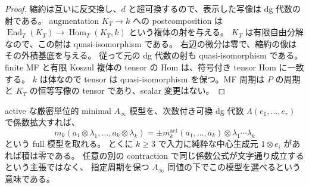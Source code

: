 \begin{proof}
縮約は互いに反交換し、$d$ と超可換するので、表示した写像は dg 代数の射である。
augmentation $K_T\to k$ への postcomposition は
$\operatorname{End}_T(K_T)\to\operatorname{Hom}_T(K_T,k)$ という複体の射を与える。
$K_T$ は有限自由分解なので、この射は quasi-isomorphism である。
右辺の微分は零で、縮約の像はその外積基底を与える。
従って元の dg 代数の射も quasi-isomorphism である。
finite MF と有限 Koszul 複体の tensor の Hom は、符号付き tensor Hom に一致する。
$k$ は体なので tensor は quasi-isomorphism を保つ。MF 周期は $P$ の周期と
$K_T$ の恒等写像の tensor であり、scalar 変更はない。
\end{proof}

\begin{remark}[高次積を分離する際の意味]
active な厳密単位的 minimal $A_\infty$ 模型を、次数付き可換 dg 代数
$\Lambda(e_1,\ldots,e_r)$ で係数拡大すれば、
\[
 m_k(a_1\otimes\lambda_1,\ldots,a_k\otimes\lambda_k)
 =\pm m_k^{\mathrm{act}}(a_1,\ldots,a_k)
            \otimes\lambda_1\cdots\lambda_k
\]
という full 模型を取れる。
とくに $k\ge3$ で入力に純粋な中心生成元 $1\otimes e_i$ があれば積は零である。
任意の別の contraction で同じ係数公式が文字通り成立するという主張ではなく、
指定周期を保つ $A_\infty$ 同値の下でこの模型を選べるという意味である。
\end{remark}

